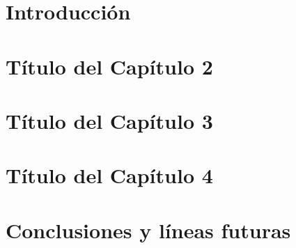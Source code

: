 \documentclass[12pt,a4paper,oneside]{report}
\begin{document}
\newpage{\pagestyle{empty}}

\listoftables

\newpage{\pagestyle{empty}}

\newpage
\thispagestyle{empty}

\renewcommand{\thepage}{\arabic{page}}
\setcounter{page}{1}
\pagestyle{plain}

\chapter{\LARGE Introducción}
\label{chapter:intro}



\newpage{\pagestyle{empty}}
\thispagestyle{empty}

\chapter{\LARGE Título del Capítulo 2}
\label{chapter:dos}



\newpage{\pagestyle{empty}}
\thispagestyle{empty}

\chapter{\LARGE Título del Capítulo 3}
\label{chapter:tres}



\newpage{\pagestyle{empty}}
\thispagestyle{empty}

\chapter{\LARGE Título del Capítulo 4}
\label{chapter:cuatro}



\newpage{\pagestyle{empty}}
\thispagestyle{empty}

\chapter{\LARGE Conclusiones y líneas futuras}
\label{chapter:conclusiones}
\end{document}
